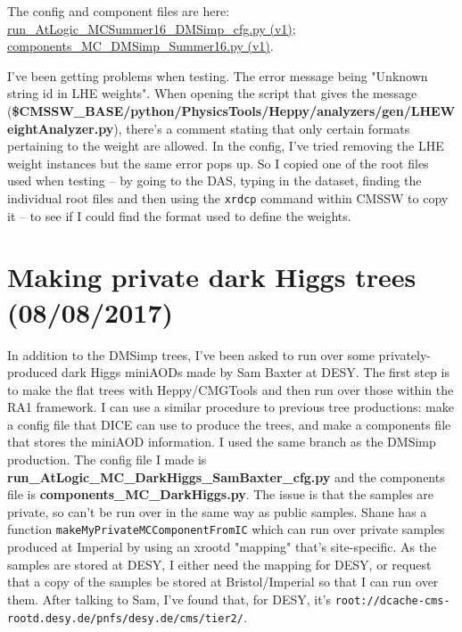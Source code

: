 The config and component files are here: \href{run:modules/Sec 24 - Making DMSimp dark matter treeslistings/run_AtLogic_MCSummer16_DMSimp_cfgv1.py}{run\_AtLogic\_MCSummer16\_DMSimp\_cfg.py (v1)}; \href{run:modules/Sec 24 - Making DMSimp dark matter treeslistings/components_MC_DMSimp_Summer16v1.py}{components\_MC\_DMSimp\_Summer16.py (v1)}.

I've been getting problems when testing. The error message being "Unknown string id in LHE weights". When opening the script that gives the message (\textbf{\$CMSSW\_BASE/python/PhysicsTools/Heppy/analyzers/gen/LHEWeightAnalyzer.py}), there's a comment stating that only certain formats pertaining to the weight are allowed. In the config, I've tried removing the LHE weight instances but the same error pops up. So I copied one of the root files used when testing -- by going to the DAS, typing in the dataset, finding the individual root files and then using the \texttt{xrdcp} command within CMSSW to copy it -- to see if I could find the format used to define the weights.




\section{Making private dark Higgs trees (08/08/2017)}

In addition to the DMSimp trees, I've been asked to run over some privately-produced dark Higgs miniAODs made by Sam Baxter at DESY. The first step is to make the flat trees with Heppy/CMGTools and then run over those within the RA1 framework. I can use a similar procedure to previous tree productions: make a config file that DICE can use to produce the trees, and make a components file that stores the miniAOD information. I used the same branch as the DMSimp production. The config file I made is \textbf{run\_AtLogic\_MC\_DarkHiggs\_SamBaxter\_cfg.py} and the components file is \textbf{components\_MC\_DarkHiggs.py}. The issue is that the samples are private, so can't be run over in the same way as public samples. Shane has a function \texttt{makeMyPrivateMCComponentFromIC} which can run over private samples produced at Imperial by using an xrootd "mapping" that's site-specific. As the samples are stored at DESY, I either need the mapping for DESY, or request that a copy of the samples be stored at Bristol/Imperial so that I can run over them. After talking to Sam, I've found that, for DESY, it's \texttt{root://dcache-cms-rootd.desy.de/pnfs/desy.de/cms/tier2/}.


